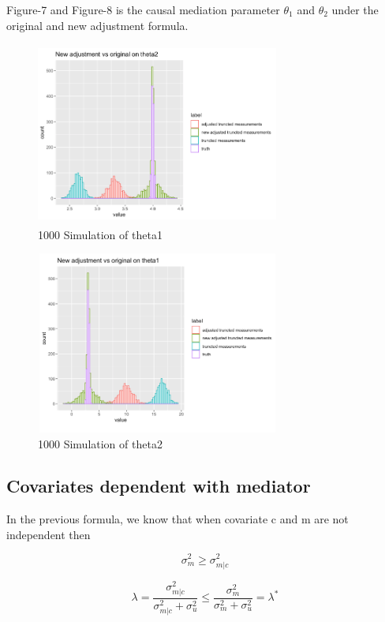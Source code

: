 \documentclass{article}
\begin{document}
Figure-7 and Figure-8 is the causal mediation parameter $\theta_1$ and $\theta_2$ under the original and new adjustment formula.


\begin{figure}[h]
\centering
\includegraphics[width = 8cm,height = 6cm]{figure-5.png}
\caption{1000 Simulation of theta1}
\label{fig5}
\end{figure}



\begin{figure}[h]
\centering
\includegraphics[width = 8cm,height = 6cm]{figure-6.png}
\caption{1000 Simulation of theta2 }
\label{fig6}
\end{figure}



\subsection{Covariates dependent with mediator}


In the previous formula, we know that when covariate c and m are not independent then


\begin{equation}
\sigma^2_{m}  \ge \sigma^2_{m|c}
\end{equation}

\begin{equation}
 \lambda = \frac{\sigma_{m|c}^2}{\sigma_{m|c}^2 + \sigma_{u}^2} \le \frac{\sigma_{m}^2}{\sigma_{m}^2 + \sigma_{u}^2} = \lambda^*
\end{equation}
\end{document}

